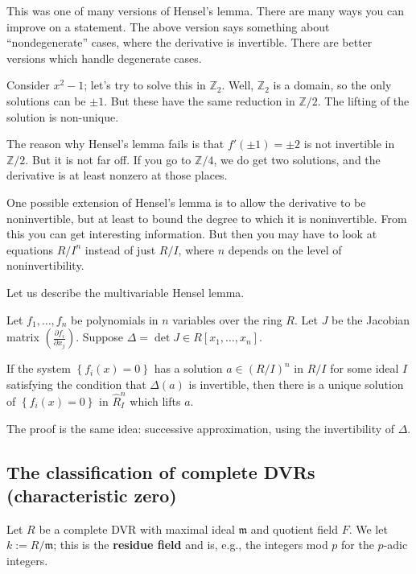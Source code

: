 This was one of many versions of Hensel's lemma. There are many ways you can
improve on a statement. The above version says something about
``nondegenerate'' cases, where the derivative is invertible. There are better
versions which handle degenerate cases.

\begin{example} 
Consider $x^2 - 1$; let's try to solve this in $\mathbb{Z}_2$. Well,
$\mathbb{Z}_2$ is a domain, so the only solutions can be $\pm 1$. But these
have the same reduction in $\mathbb{Z}/2$. The lifting of the solution is
non-unique.

The reason why Hensel's lemma fails is that $f'(\pm 1) = \pm 2$ is not
invertible in $\mathbb{Z}/2$. But it is not far off. If you go to
$\mathbb{Z}/4$, we do get two solutions, and the derivative is at least nonzero
at those places.
\end{example} 

One possible extension of Hensel's lemma is to allow the derivative to be
noninvertible, but at least to bound the degree to which it is noninvertible.
From this you can get interesting information. 
But then you may have to look at equations $R/I^n$ instead of just $R/I$, where
$n$ depends on the level of noninvertibility.

Let us describe the multivariable Hensel lemma.

\begin{theorem} 
Let $f_1, \dots, f_n$ be polynomials in $n$ variables over the ring $R$. Let
$J$ be the Jacobian matrix $( \frac{\partial f_i}{\partial x_j})$. Suppose
$\Delta = \det J \in R[x_1, \dots, x_n]$. 

If the system $\left\{f_i(x) = 0\right\}$ has a solution $a \in (R/I)^n$ in $R/I$ for some
ideal $I$ satisfying the condition that $\Delta(a)$ is invertible, then there
is a unique solution of $\left\{f_i(x) =0\right\}$ in $\hat{R}_I^n$ which lifts $a$. 
\end{theorem} 
The proof is the same idea: successive approximation, using the invertibility
of $\Delta$. 

\subsection{The classification of complete DVRs (characteristic zero)}
Let $R$ be a complete DVR with maximal ideal $\mathfrak{m}$ and quotient field
$F$.  We let $k:=R/\mathfrak{m}$; this is the \textbf{residue field} and is,
e.g., the integers mod $p$ for the $p$-adic integers.

